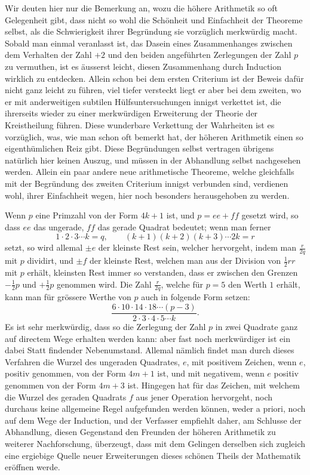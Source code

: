 \documentclass[12pt]{article}
\begin{document}
Wir deuten hier nur die Bemerkung an, wozu die höhere Arithmetik so oft Gelegenheit gibt, dass nicht so wohl die Schönheit und Einfachheit der Theoreme selbst, als die Schwierigkeit ihrer Begründung sie vorzüglich merkwürdig macht. Sobald man einmal veranlasst ist, das Dasein eines Zusammenhanges zwischen dem Verhalten der Zahl $+2$ und den beiden angeführten Zerlegungen der Zahl $p$ zu vermuthen, ist es äusserst leicht, diesen Zusammenhang durch Induction wirklich zu entdecken. Allein schon bei dem ersten Criterium ist der Beweis dafür nicht ganz leicht zu führen, viel tiefer versteckt liegt er aber bei dem zweiten, wo er mit anderweitigen subtilen Hülfsuntersuchungen innigst verkettet ist, die ihrerseits wieder zu einer merkwürdigen Erweiterung der Theorie der Kreistheilung führen. Diese wunderbare Verkettung der Wahrheiten ist es vorzüglich, was, wie man schon oft bemerkt hat, der höheren Arithmetik einen so eigenthümlichen Reiz gibt. Diese Begründungen selbst vertragen übrigens natürlich hier keinen Auszug, und müssen in der Abhandlung selbst nachgesehen werden. Allein ein paar andere neue arithmetische Theoreme, welche gleichfalls mit der Begründung des zweiten Criterium innigst verbunden sind, verdienen wohl, ihrer Einfachheit wegen, hier noch besonders herausgehoben zu werden.

Wenn $p$ eine Primzahl von der Form $4k+1$ ist, und $p=ee+ff$ gesetzt wird, so dass $ee$ das ungerade, $ff$ das gerade Quadrat bedeutet; wenn man ferner
\[
1\cdot2\cdot3\cdots k=q,\qquad (k+1)(k+2)(k+3)\cdots2k=r
\]
setzt, so wird allemal $\pm e$ der kleinste Rest sein, welcher hervorgeht, indem man $\frac{r}{2q}$ mit $p$ dividirt, und $\pm f$ der kleinste Rest, welchen man aus der Division von $\frac12rr$ mit $p$ erhält, kleinsten Rest immer so verstanden, dass er zwischen den Grenzen $-\frac12p$ und $+\frac12p$ genommen wird. Die Zahl $\frac{r}{2q}$, welche für $p=5$ den Werth $1$ erhält, kann man für grössere Werthe von $p$ auch in folgende Form setzen:
\[
\frac{6\cdot10\cdot14\cdot18\cdots(p-3)}{2\cdot3\cdot4\cdot5\cdots k}.
\]
Es ist sehr merkwürdig, dass so die Zerlegung der Zahl $p$ in zwei Quadrate ganz auf directem Wege erhalten werden kann: aber fast noch merkwürdiger ist ein dabei Statt findender Nebenumstand. Allemal nämlich findet man durch dieses Verfahren die Wurzel des ungeraden Quadrates, $e$, mit positivem Zeichen, wenn $e$, positiv genommen, von der Form $4m+1$ ist, und mit negativem, wenn $e$ positiv genommen von der Form $4m+3$ ist. Hingegen hat für das Zeichen, mit welchem die Wurzel des geraden Quadrats $f$ aus jener Operation hervorgeht, noch durchaus keine allgemeine Regel aufgefunden werden können, weder a priori, noch auf dem Wege der Induction, und der Verfasser empfiehlt daher, am Schlusse der Abhandlung, diesen Gegenstand den Freunden der höheren Arithmetik zu weiterer Nachforschung, überzeugt, dass mit dem Gelingen derselben sich zugleich eine ergiebige Quelle neuer Erweiterungen dieses schönen Theils der Mathematik eröffnen werde.
\end{document}
